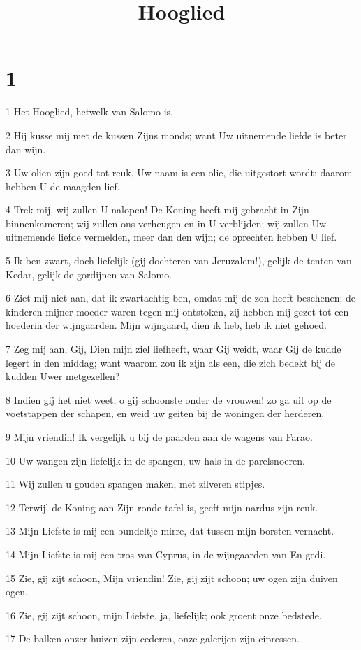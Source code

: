 

\title{Hooglied}



\chapter{1}

\par 1 Het Hooglied, hetwelk van Salomo is.
\par 2 Hij kusse mij met de kussen Zijns monds; want Uw uitnemende liefde is beter dan wijn.
\par 3 Uw olien zijn goed tot reuk, Uw naam is een olie, die uitgestort wordt; daarom hebben U de maagden lief.
\par 4 Trek mij, wij zullen U nalopen! De Koning heeft mij gebracht in Zijn binnenkameren; wij zullen ons verheugen en in U verblijden; wij zullen Uw uitnemende liefde vermelden, meer dan den wijn; de oprechten hebben U lief.
\par 5 Ik ben zwart, doch liefelijk (gij dochteren van Jeruzalem!), gelijk de tenten van Kedar, gelijk de gordijnen van Salomo.
\par 6 Ziet mij niet aan, dat ik zwartachtig ben, omdat mij de zon heeft beschenen; de kinderen mijner moeder waren tegen mij ontstoken, zij hebben mij gezet tot een hoederin der wijngaarden. Mijn wijngaard, dien ik heb, heb ik niet gehoed.
\par 7 Zeg mij aan, Gij, Dien mijn ziel liefheeft, waar Gij weidt, waar Gij de kudde legert in den middag; want waarom zou ik zijn als een, die zich bedekt bij de kudden Uwer metgezellen?
\par 8 Indien gij het niet weet, o gij schoonste onder de vrouwen! zo ga uit op de voetstappen der schapen, en weid uw geiten bij de woningen der herderen.
\par 9 Mijn vriendin! Ik vergelijk u bij de paarden aan de wagens van Farao.
\par 10 Uw wangen zijn liefelijk in de spangen, uw hals in de parelsnoeren.
\par 11 Wij zullen u gouden spangen maken, met zilveren stipjes.
\par 12 Terwijl de Koning aan Zijn ronde tafel is, geeft mijn nardus zijn reuk.
\par 13 Mijn Liefste is mij een bundeltje mirre, dat tussen mijn borsten vernacht.
\par 14 Mijn Liefste is mij een tros van Cyprus, in de wijngaarden van En-gedi.
\par 15 Zie, gij zijt schoon, Mijn vriendin! Zie, gij zijt schoon; uw ogen zijn duiven ogen.
\par 16 Zie, gij zijt schoon, mijn Liefste, ja, liefelijk; ook groent onze bedstede.
\par 17 De balken onzer huizen zijn cederen, onze galerijen zijn cipressen.

